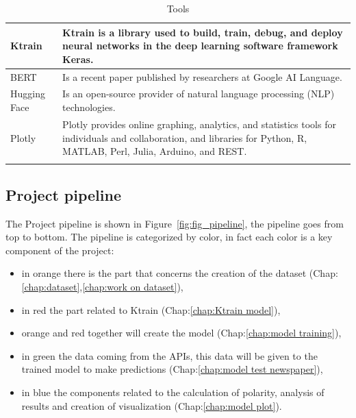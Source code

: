 \begin{longtable}[ c ]{| m{4cm} | m{10cm}|}
{\gls{Ktrain}}   & {\gls{Ktrain} is a library used to build, train, debug, and deploy neural networks in the deep learning software framework \gls{Keras}.}      \\ \hline
{\gls{BERT}}   & {Is a recent paper published by researchers at Google AI Language.}      \\ \hline
{\gls{Hugging Face}}   & {Is an open-source provider of natural language processing (NLP) technologies.} \\ \hline
{\gls{Plotly}}   & {\gls{Plotly} provides online graphing, analytics, and statistics tools for individuals and collaboration, and libraries for Python, R, MATLAB, Perl, Julia, Arduino, and REST.}   \\ \hline

 

\caption{Tools}
\label{tab:Tools}\\
\end{longtable}

\subsection{Project pipeline}
The Project pipeline is shown in Figure~\ref{fig:fig_pipeline}, the pipeline goes from top to bottom.
The pipeline is categorized by color, in fact each color is a key component of the project:
\begin{itemize}
    \item in orange there is the part that concerns the creation of the dataset (Chap:\ref{chap:dataset},\ref{chap:work on dataset}),
    \item in red the part related to \gls{Ktrain} (Chap:\ref{chap:Ktrain model}),
    \item orange and red together will create the model (Chap:\ref{chap:model training}),
    \item in green the data coming from the APIs, this data will be given to the trained model to make predictions (Chap:\ref{chap:model test newspaper}),
    \item in blue the components related to the calculation of polarity, analysis of results and creation of visualization (Chap:\ref{chap:model plot}). 
\end{itemize}
  
